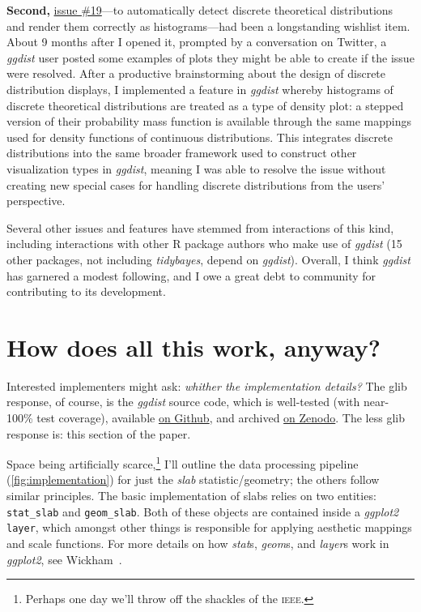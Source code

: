 \documentclass[journal]{vgtc}                     %
\begin{document}
\textbf{Second,} \href{https://github.com/mjskay/ggdist/issues/19}{issue \#19}---to automatically detect discrete theoretical distributions and render them correctly as histograms---had been a longstanding wishlist item.
About 9 months after I opened it, prompted by a conversation on Twitter, a \textit{ggdist} user posted some examples of plots they might be able to create if the issue were resolved. After a productive brainstorming about the design of discrete distribution displays, I implemented a feature in \textit{ggdist} whereby histograms of discrete theoretical distributions are treated as a type of density plot: a stepped version of their probability mass function is available through the same mappings used for density functions of continuous distributions. This integrates discrete distributions into the same broader framework used to construct other visualization types in \textit{ggdist}, meaning I was able to resolve the issue without creating new special cases for handling discrete distributions from the users' perspective.

Several other issues and features have stemmed from interactions of this kind, including interactions with other R package authors who make use of \textit{ggdist}  (15 other packages, not including \textit{tidybayes}, depend on \textit{ggdist}). Overall, I think \textit{ggdist} has garnered a modest following, and I owe a great debt to community for contributing to its development.

\section{How does all this work, anyway?}
\label{sec:implementation}

Interested implementers might ask: \textit{whither the implementation details?} The glib response, of course, is the \textit{ggdist} source code, which is well-tested (with near-100\% test coverage), available \href{https://github.com/mjskay/ggdist}{on Github}, and archived \href{https://doi.org/10.5281/zenodo.3879620}{on Zenodo}. The less glib response is: this section of the paper. 


Space being artificially scarce,\footnote{Perhaps one day we'll throw off the shackles of the \textsc{ieee}.} I'll outline the data processing pipeline (\cref{fig:implementation}) for just the \textit{slab} statistic/geometry; the others follow similar principles. The basic implementation of slabs relies on two entities: \texttt{stat\_slab} and \texttt{geom\_slab}. Both of these objects are contained inside a \textit{ggplot2} \texttt{layer}, which amongst other things is responsible for applying aesthetic mappings and scale functions. For more details on how \textit{stat}s, \textit{geom}s, and \textit{layer}s work in \textit{ggplot2}, see Wickham~\cite{wickham2010layered}.
\end{document}
